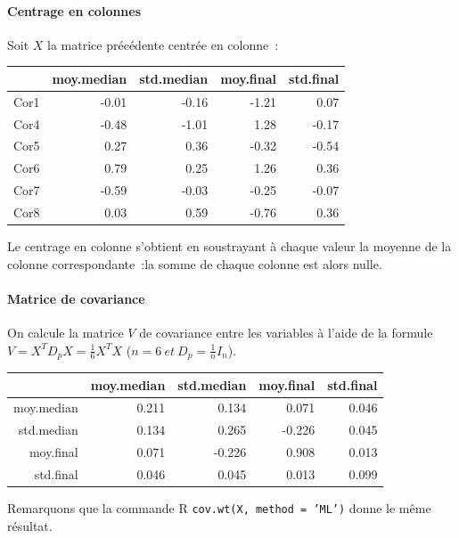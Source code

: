 \documentclass[a4paper,10pt]{report}
\begin{document}
\paragraph{Centrage en colonnes}
Soit $X$ la matrice précédente centrée en colonne~:
\begin{table}[H]
	\centering
	\begin{tabular}{r|rrrr}
		& moy.median & std.median & moy.final & std.final \\ 
		\hline
		Cor1 & -0.01 & -0.16 & -1.21 & 0.07 \\ 
		Cor4 & -0.48 & -1.01 & 1.28 & -0.17 \\ 
		Cor5 & 0.27 & 0.36 & -0.32 & -0.54 \\ 
		Cor6 & 0.79 & 0.25 & 1.26 & 0.36 \\ 
		Cor7 & -0.59 & -0.03 & -0.25 & -0.07 \\ 
		Cor8 & 0.03 & 0.59 & -0.76 & 0.36 \\ 
	\end{tabular}
\end{table}
Le centrage en colonne s'obtient en soustrayant à chaque valeur la moyenne de la colonne correspondante~:la somme de chaque colonne est alors nulle.


\paragraph{Matrice de covariance}
On calcule la matrice $V$ de covariance entre les variables à l'aide de la formule $V = X^TD_{p}X = \frac{1}{6}X^TX$ ($n = 6\ et\ D_p = \frac{1}{n}I_n$).

\begin{table}[H]
	\centering
	\begin{tabular}{r|rrrr}
		& moy.median & std.median & moy.final & std.final \\ 
		\hline
		moy.median & 0.211 & 0.134 & 0.071 & 0.046 \\ 
		std.median & 0.134 & 0.265 & -0.226 & 0.045 \\ 
		moy.final & 0.071 & -0.226 & 0.908 & 0.013 \\ 
		std.final & 0.046 & 0.045 & 0.013 & 0.099 \\ 
	\end{tabular}
\end{table}

Remarquons que la commande R \texttt{cov.wt(X, method = 'ML')} donne le même résultat.
\end{document}
